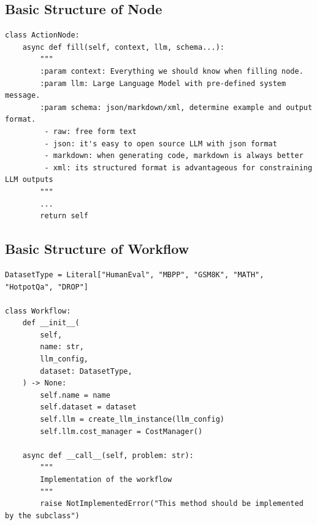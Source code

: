 \subsection{Basic Structure of Node}
\label{appendix:node structure}
\begin{tcolorbox}[title={\textbf{\small Node structure}}, boxrule=1pt, arc=0mm, colback=black!5!white, colframe=black!75!white, breakable, before skip=10pt, after skip=10pt, pad at break=2mm, parbox=false] \begin{verbatim}
class ActionNode:
    async def fill(self, context, llm, schema...):
        """
        :param context: Everything we should know when filling node.
        :param llm: Large Language Model with pre-defined system message.
        :param schema: json/markdown/xml, determine example and output format.
         - raw: free form text
         - json: it's easy to open source LLM with json format
         - markdown: when generating code, markdown is always better
         - xml: its structured format is advantageous for constraining LLM outputs
        """
        ...
        return self
\end{verbatim}
\end{tcolorbox}

\subsection{Basic Structure of Workflow}
\label{appendix:graph structure}
\begin{tcolorbox}[title={\textbf{\small Workflow structure}}, boxrule=1pt, arc=0mm, colback=black!5!white, colframe=black!75!white, breakable, before skip=10pt, after skip=10pt, pad at break=2mm, parbox=false] \begin{verbatim}
DatasetType = Literal["HumanEval", "MBPP", "GSM8K", "MATH", "HotpotQa", "DROP"]

class Workflow:
    def __init__(
        self,
        name: str,
        llm_config,
        dataset: DatasetType,
    ) -> None:
        self.name = name
        self.dataset = dataset
        self.llm = create_llm_instance(llm_config)
        self.llm.cost_manager = CostManager()

    async def __call__(self, problem: str):
        """
        Implementation of the workflow
        """
        raise NotImplementedError("This method should be implemented by the subclass")
\end{verbatim}
\end{tcolorbox}

